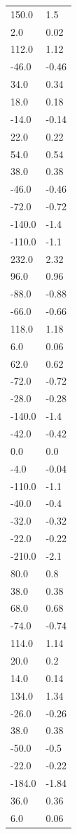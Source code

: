 \begin{longtable}{ll}
150.0 & 1.5 \\
2.0 & 0.02 \\
112.0 & 1.12 \\
-46.0 & -0.46 \\
34.0 & 0.34 \\
18.0 & 0.18 \\
-14.0 & -0.14 \\
22.0 & 0.22 \\
54.0 & 0.54 \\
38.0 & 0.38 \\
-46.0 & -0.46 \\
-72.0 & -0.72 \\
-140.0 & -1.4 \\
-110.0 & -1.1 \\
232.0 & 2.32 \\
96.0 & 0.96 \\
-88.0 & -0.88 \\
-66.0 & -0.66 \\
118.0 & 1.18 \\
6.0 & 0.06 \\
62.0 & 0.62 \\
-72.0 & -0.72 \\
-28.0 & -0.28 \\
-140.0 & -1.4 \\
-42.0 & -0.42 \\
0.0 & 0.0 \\
-4.0 & -0.04 \\
-110.0 & -1.1 \\
-40.0 & -0.4 \\
-32.0 & -0.32 \\
-22.0 & -0.22 \\
-210.0 & -2.1 \\
80.0 & 0.8 \\
38.0 & 0.38 \\
68.0 & 0.68 \\
-74.0 & -0.74 \\
114.0 & 1.14 \\
20.0 & 0.2 \\
14.0 & 0.14 \\
134.0 & 1.34 \\
-26.0 & -0.26 \\
38.0 & 0.38 \\
-50.0 & -0.5 \\
-22.0 & -0.22 \\
-184.0 & -1.84 \\
36.0 & 0.36 \\
6.0 & 0.06 \\

\end{longtable}

